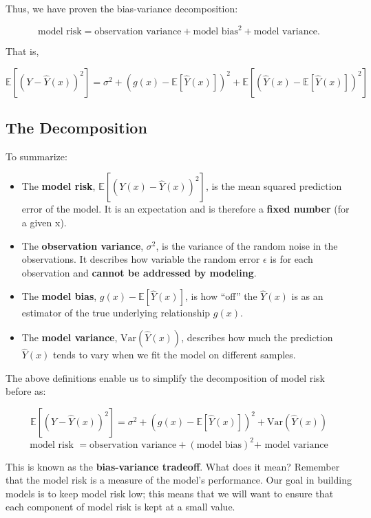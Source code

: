 \documentclass[
  letterpaper,
  DIV=11,
  numbers=noendperiod]{scrreprt}
\providecommand{\tightlist}{%
  \setlength{\itemsep}{0pt}\setlength{\parskip}{0pt}}\usepackage{longtable,booktabs,array}
\begin{document}
\begin{tcolorbox}[enhanced jigsaw, breakable, arc=.35mm, leftrule=.75mm, left=2mm, colframe=quarto-callout-color-frame, rightrule=.15mm, bottomrule=.15mm, toprule=.15mm, opacityback=0, colback=white]
Thus, we have proven the bias-variance decomposition:

\[
\text{model risk} = \text{observation variance} + \text{model bias}^2 + \text{model variance}.
\]

That is,

\[
\mathbb{E}\left[(Y-\hat{Y}(x))^2\right] = \sigma^2 + \left(g(x) - \mathbb{E}\left[\hat{Y}(x)\right]\right)^2 + \mathbb{E}\left[\left(\hat{Y}(x)-\mathbb{E}\left[\hat{Y}(x)\right]\right)^2\right]
\]

\end{tcolorbox}

\subsection{The Decomposition}\label{the-decomposition}

To summarize:

\begin{itemize}
\tightlist
\item
  The \textbf{model risk},
  \(\mathbb{E}\left[(Y(x)-\hat{Y}(x))^2\right]\), is the mean squared
  prediction error of the model. It is an expectation and is therefore a
  \textbf{fixed number} (for a given x).
\item
  The \textbf{observation variance}, \(\sigma^2\), is the variance of
  the random noise in the observations. It describes how variable the
  random error \(\epsilon\) is for each observation and \textbf{cannot
  be addressed by modeling}.
\item
  The \textbf{model bias}, \(g(x) - \mathbb{E}\left[\hat{Y}(x)\right]\),
  is how ``off'' the \(\hat{Y}(x)\) is as an estimator of the true
  underlying relationship \(g(x)\).
\item
  The \textbf{model variance}, \(\text{Var}(\hat{Y}(x))\), describes how
  much the prediction \(\hat{Y}(x)\) tends to vary when we fit the model
  on different samples.
\end{itemize}

The above definitions enable us to simplify the decomposition of model
risk before as:

\[ \mathbb{E}\left[\left(Y - \hat{Y}(x)\right)^2\right] = \sigma^2 + \left(g(x) - \mathbb{E}[\hat{Y}(x)]\right)^2 + \text{Var}\left(\hat{Y}(x)\right) \]
\[\text{model risk } = \text{observation variance} + (\text{model bias})^2 \text{+ model variance}\]

This is known as the \textbf{bias-variance tradeoff}. What does it mean?
Remember that the model risk is a measure of the model's performance.
Our goal in building models is to keep model risk low; this means that
we will want to ensure that each component of model risk is kept at a
small value.
\end{document}
